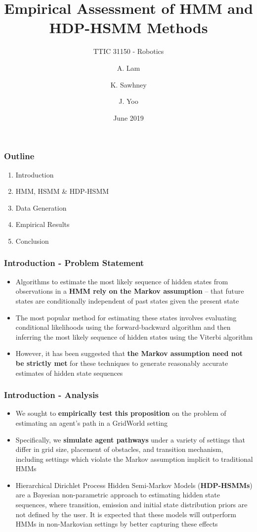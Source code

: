 \documentclass{beamer}
\title[]{Empirical Assessment of HMM and HDP-HSMM Methods}
\subtitle{TTIC 31150 - Robotics}
\author[Lam, Sawhney, Yoo]{A. Lam \and K. Sawhney \and J. Yoo}
\date[June 2019]{June 2019}
\begin{document}
\frame{\titlepage}

\begin{frame}
\frametitle{Outline}
    \begin{enumerate}[I]
        \item Introduction
        \item HMM, HSMM \& HDP-HSMM
        \item Data Generation
        \item Empirical Results
        \item Conclusion
    \end{enumerate}
\end{frame}


\begin{frame}
\frametitle{Introduction - Problem Statement}
    \begin{itemize}
        \item Algorithms to estimate the most likely sequence of hidden states from observations in a \textbf{HMM rely on the Markov assumption} -- that future states are conditionally independent of past states given the present state
        \item The most popular method for estimating these states involves evaluating conditional likelihoods using the forward-backward algorithm and then inferring the most likely sequence of hidden states using the Viterbi algorithm
        \item However, it has been suggested that \textbf{the Markov assumption need not be strictly met} for these techniques to generate reasonably accurate estimates of hidden state sequences
    \end{itemize}
\end{frame}

\begin{frame}
    \frametitle{Introduction - Analysis}
        \begin{itemize}
            \item We sought to \textbf{empirically test this proposition} on the problem of estimating an agent's path in a GridWorld setting
            \item Specifically, we \textbf{simulate agent pathways} under a variety of settings that differ in grid size, placement of obstacles, and transition mechanism, including settings which violate the Markov assumption implicit to traditional HMMs
            \item Hierarchical Dirichlet Process Hidden Semi-Markov Models (\textbf{HDP-HSMMs}) are a Bayesian non-parametric approach to estimating hidden state sequences, where transition, emission and initial state distribution priors are not defined by the user. It is expected that these models will outperform HMMs in non-Markovian settings by better capturing these effects
        \end{itemize}
    \end{frame}
\end{document}
